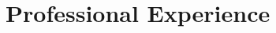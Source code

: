 \documentclass[11pt,a4paper,sans]{moderncv}
\makeatletter
\newcommand*{\customcventry}[7][0.13em]{
  \begin{tabular}{@{}l}
    {\bfseries #4} \
    {\itshape #3}
  \end{tabular}
  \hfill
  \begin{tabular}{l@{}}
    {\bfseries #5} \
    {\itshape #2}
  \end{tabular}
  \ifx&#7&
  \else{\
    \begin{minipage}{\maincolumnwidth}
      \small#7
  \end{minipage}}\fi
  \par\addvspace{#1}
}
\makeatother
\begin{document}
\section{Professional Experience}
\end{document}
